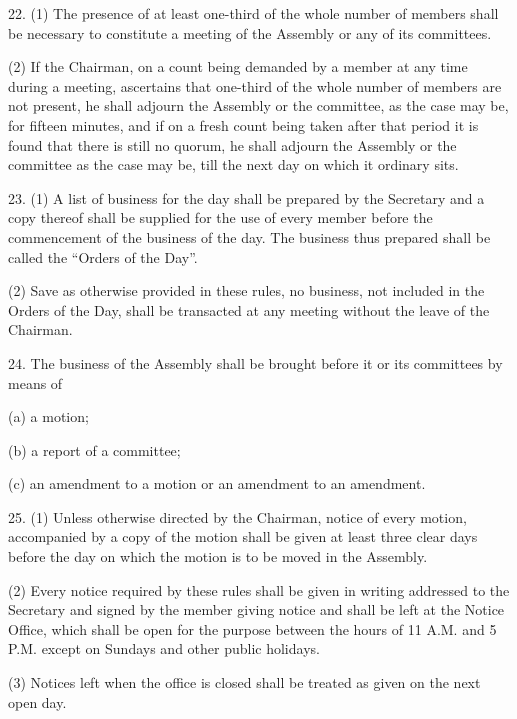 22. (1) The presence of at least one-third of the whole number of members shall be necessary to constitute a meeting of the Assembly or any of its committees.



(2) If the Chairman, on a count being demanded by a member at any time during a meeting, ascertains that one-third of the whole number of members are not present, he shall adjourn the Assembly or the committee, as the case may be, for fifteen minutes, and if on a fresh count being taken after that period it is found that there is still no quorum, he shall adjourn the Assembly or the committee as the case may be, till the next day on which it ordinary sits.



23. (1) A list of business for the day shall be prepared by the Secretary and a copy thereof shall be supplied for the use of every member before the commencement of the business of the day. The business thus prepared shall be called the \textquotedblleft{}Orders of the Day\textquotedblright{}.~



(2) Save as otherwise provided in these rules, no business, not included in the Orders of the Day, shall be transacted at any meeting without the leave of the Chairman.



24. The business of the Assembly shall be brought before it or its committees by means of\textemdash{}



(a) a motion;

(b) a report of a committee;~

(c) an amendment to a motion or an amendment to an amendment.



25. (1) Unless otherwise directed by the Chairman, notice of every motion, accompanied by a copy of the motion shall be given at least three clear days before the day on which the motion is to be moved in the Assembly.



(2) Every notice required by these rules shall be given in writing addressed to the Secretary and signed by the member giving notice and shall be left at the Notice Office, which shall be open for the purpose between the hours of 11 A.M. and 5 P.M. except on Sundays and other public holidays.



(3) Notices left when the office is closed shall be treated as given on the next open day.



